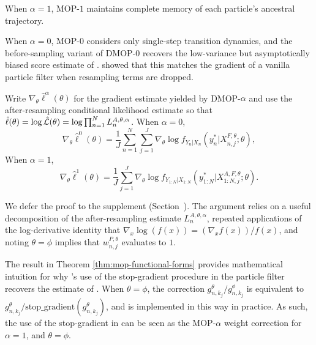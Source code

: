 \documentclass[11pt]{article}
\begin{document}
When $\alpha=1$, MOP-$1$ maintains complete memory of each particle's ancestral trajectory.
\newEdit{\editPoyiadjisCorrespondence}

When $\alpha=0$, MOP-$0$ considers only single-step transition dynamics, and the before-sampling variant of DMOP-$0$ recovers the low-variance but asymptotically biased score estimate of \cite{naesseth18}.
\cite{scibior21} showed that this matches the gradient of a vanilla particle filter when resampling terms are dropped. 

\begin{thm}
    \label{thm:mop-functional-forms}
    Write $\nabla_\theta \hat\ell^\alpha(\theta)$ for the gradient estimate yielded by DMOP-$\alpha$ 
    and use the after-resampling conditional likelihood estimate so that $\hat{\ell}(\theta)= \log \hat{\mathcal{L}}(\theta) = \log \prod_{n=1}^N L_n^{A, \theta, \alpha}$. When $\alpha=0$,
    \begin{equation} \nonumber %
        \nabla_\theta \hat\ell^0(\theta) 
        = \frac{1}{J} \sum_{n=1}^N \sum_{j=1}^J \nabla_\theta \log f_{Y_n|X_{n}}\left(y_n^*|X_{n,j}^{F, \theta}; \theta\right),
    \end{equation}
    \newEdit{\editTheoremOne}
    When $\alpha=1$,
    \begin{equation} \nonumber %
        \nabla_\theta \hat{\ell}^1(\theta) 
        = \frac{1}{J}\sum_{j=1}^J \nabla_\theta \log f_{Y_{1:N}|X_{1:N}}\left(y_{1:N}^* | X_{1:N,j}^{A,F,\theta}; \theta \right).
    \end{equation}
    \newEdit{\editAncestorDefinition}
\end{thm}

We defer the proof to the supplement (Section~\suppSecProofFunctionalForms). 
The argument relies on a useful decomposition of the after-resampling estimate $L_n^{A,\theta,\alpha}$, repeated applications of the log-derivative identity that $\nabla_x \log(f(x)) = (\nabla_x f(x))/f(x)$, and noting $\theta=\phi$ implies that $w_{n,j}^{P,\theta}$ evaluates to $1$. 

The result in Theorem \ref{thm:mop-functional-forms} provides mathematical intuition for why \cite{scibior21}'s use of the stop-gradient procedure in the particle filter recovers the estimate of \cite{poyiadjis11}.
When $\theta=\phi$, the correction $g_{n,k_j}^\theta/g_{n,k_j}^\phi$ is equivalent to $g_{n,k_j}^\theta / \text{stop\_gradient}(g_{n,k_j}^\theta)$, and is implemented in this way in practice.
As such, the use of the stop-gradient in \cite{scibior21} can be seen as the MOP-$\alpha$ weight correction for $\alpha=1$, and $\theta=\phi$.
\end{document}
